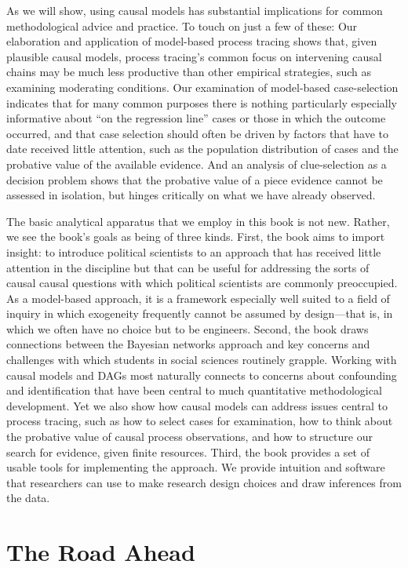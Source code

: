 \documentclass[
  12pt,
]{book}
\begin{document}
As we will show, using causal models has substantial implications for common methodological advice and practice. To touch on just a few of these: Our elaboration and application of model-based process tracing shows that, given plausible causal models, process tracing's common focus on intervening causal chains may be much less productive than other empirical strategies, such as examining moderating conditions. Our examination of model-based case-selection indicates that for many common purposes there is nothing particularly especially informative about ``on the regression line'' cases or those in which the outcome occurred, and that case selection should often be driven by factors that have to date received little attention, such as the population distribution of cases and the probative value of the available evidence. And an analysis of clue-selection as a decision problem shows that the probative value of a piece evidence cannot be assessed in isolation, but hinges critically on what we have already observed.

The basic analytical apparatus that we employ in this book is not new. Rather, we see the book's goals as being of three kinds. First, the book aims to import insight: to introduce political scientists to an approach that has received little attention in the discipline but that can be useful for addressing the sorts of causal causal questions with which political scientists are commonly preoccupied. As a model-based approach, it is a framework especially well suited to a field of inquiry in which exogeneity frequently cannot be assumed by design---that is, in which we often have no choice but to be engineers. Second, the book draws connections between the Bayesian networks approach and key concerns and challenges with which students in social sciences routinely grapple. Working with causal models and DAGs most naturally connects to concerns about confounding and identification that have been central to much quantitative methodological development. Yet we also show how causal models can address issues central to process tracing, such as how to select cases for examination, how to think about the probative value of causal process observations, and how to structure our search for evidence, given finite resources. Third, the book provides a set of usable tools for implementing the approach. We provide intuition and software that researchers can use to make research design choices and draw inferences from the data.

\hypertarget{the-road-ahead}{%
\section{The Road Ahead}\label{the-road-ahead}}
\end{document}
